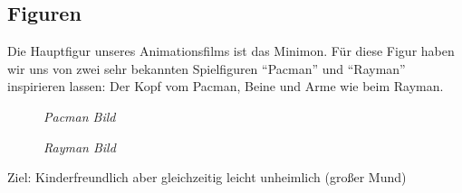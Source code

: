 \subsection{Figuren}

Die Hauptfigur unseres Animationsfilms ist das Minimon. Für diese Figur haben wir uns von zwei sehr bekannten Spielfiguren ``Pacman'' und ``Rayman'' inspirieren lassen: Der Kopf vom Pacman, Beine und Arme wie beim Rayman.

\begin{figure}[h]
	\begin{minipage}{0.45\textwidth}
		\textit{Pacman Bild}
	\end{minipage}
	\hfill
	\begin{minipage}{0.45\textwidth}
		\textit{Rayman Bild}
	\end{minipage}	
\end{figure}

Ziel: Kinderfreundlich aber gleichzeitig leicht unheimlich (großer Mund)
